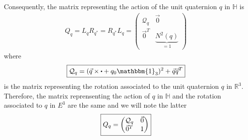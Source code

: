 \documentclass[class=report, float=false, crop=false]{standalone}
\begin{document}
Consequently, the matrix representing the action of the unit quaternion $q$ in $\mathbb{H}$ is
\begin{align*}
Q_q = L_qR_{q^*} = R_{q^*}L_q = \begin{pmatrix} \mathcal{Q}_q & \vec{0} \\ \vec{0}^T & \underbrace{N^2(q)}_{=1} \end{pmatrix}
\end{align*}
where
\begin{equation}
\boxed{\mathcal{Q}_q = (\vec{q}\times\bigcdot + q_0\mathbbm{1}_3)^2 + \vec{q}\vec{q}^T}
\label{rotation_matrix_R3}
\end{equation}
is the matrix representing the rotation associated to the unit quaternion $q$ in $\mathbb{R}^3$.\\

Therefore, the matrix reprensenting the action of $q$ in $\mathbb{H}$ and the rotation associated to $q$ in $E^3$ are the same and we will note the latter
\begin{equation}
\boxed{Q_q = \begin{pmatrix} \mathcal{Q}_q & \vec{0} \\ \vec{0}^T & 1 \end{pmatrix}}
\label{rotation_matrix}\\
\end{equation}
\end{document}
